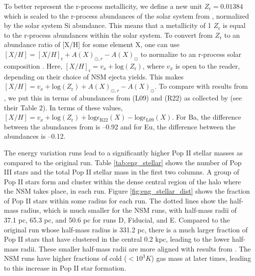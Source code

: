 \documentclass[fleqn,usenatbib]{mnras}
\begin{document}
To better represent the r-process metallicity, we define a new unit $Z_{\mathrm{r}} = 0.01384$ which is scaled to the r-process abundances of the solar system from \citet{Goriely99}, normalized by the solar system Si abundance. This means that a metallicity of 1 $Z_{\mathrm{r}}$ is equal to the r-process abundances within the solar system. To convert from $Z_{\mathrm{r}}$ to an abundance ratio of [X/H] for some element X, one can use $[X/H] = [X/H]_{\mathrm{r}} + A(X)_{\odot, r} - A(X)_{\odot}$ to normalize to an r-process solar composition \cite[see Step \#3 in Table 2 of][for an excellent description of metallicity conversions]{Hinkel22}. Here, $[X/H]_{\mathrm{r}} = v_{x} + \mathrm{log}(Z_{\mathrm{r}})$, where $v_{x}$ is open to the reader, depending on their choice of NSM ejecta yields. This makes $[X/H] = v_{x} + \mathrm{log}(Z_{\mathrm{r}}) + A(X)_{\odot, r} - A(X)_{\odot}$. To compare with results from \citet{Frebel23}, we put this in terms of abundances from \citet{Lodders09} (L09) and \citet{Roederer22} (R22) as collected by \citet{Frebel23} (see their Table 2). In terms of these values, $[X/H] = v_{x} + \mathrm{log}(Z_{\mathrm{r}}) + \mathrm{log} \epsilon_{\mathrm{R22}} (X) - \mathrm{log} \epsilon_{\mathrm{L09}} (X)$. For Ba, the difference between the abundances from \citet{Frebel23} is --0.92 and for Eu, the difference between the abundances is --0.12. 

The energy variation runs lead to a significantly higher Pop II stellar masses as compared to the original run. Table \ref{tab:eng_stellar} shows the number of Pop III stars and the total Pop II stellar mass in the first two columns. A group of Pop II stars form and cluster within the dense central region of the halo where the NSM takes place, in each run. Figure \ref{fig:eng_stellar_dist} shows the fraction of Pop II stars within some radius for each run. The dotted lines show the half-mass radius, which is much smaller for the NSM runs, with half-mass radii of 37.1 pc, 65.3 pc, and 50.6 pc for runs D, Fiducial, and E. Compared to the original run whose half-mass radius is 331.2 pc, there is a much larger fraction of Pop II stars that have clustered in the central 0.2 kpc, leading to the lower half-mass radii. These smaller half-mass radii are more aligned with results from \citet{Ricotti16}. The NSM runs have higher fractions of cold ($< 10^{3} K$) gas mass at later times, leading to this increase in Pop II star formation.
\end{document}
